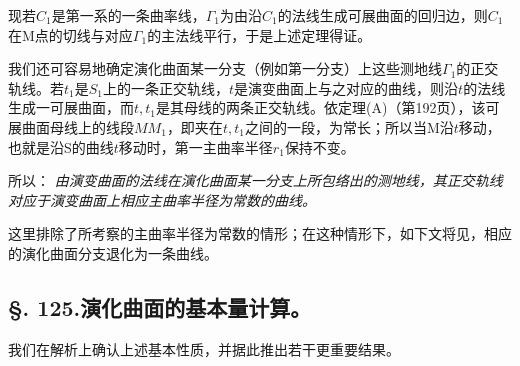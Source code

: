 现若\(C_1\)是第一系的一条曲率线，\(\Gamma_1\)为由沿\(C_1\)的法线生成可展曲面的回归边，则\(C_1\)在M点的切线与对应\(\Gamma_1\)的主法线平行，于是上述定理得证。

我们还可容易地确定演化曲面某一分支（例如第一分支）上这些测地线\(\Gamma_1\)的正交轨线。若\(t_1\)是\(S_1\)上的一条正交轨线，\(t\)是演变曲面上与之对应的曲线，则沿\(t\)的法线生成一可展曲面，而\(t,t_1\)是其母线的两条正交轨线。依定理(A)（第192页），该可展曲面母线上的线段\(MM_1\)，即夹在\(t,t_1\)之间的一段，为常长；所以当M沿\(t\)移动，也就是沿S的曲线\(t\)移动时，第一主曲率半径\(r_1\)保持不变。

所以：
\emph{由演变曲面的法线在演化曲面某一分支上所包络出的测地线，其正交轨线对应于演变曲面上相应主曲率半径为常数的曲线。}

这里排除了所考察的主曲率半径为常数的情形；在这种情形下，如下文将见，相应的演化曲面分支退化为一条曲线。

\subsection*{\S. 125.\quad 演化曲面的基本量计算。}

我们在解析上确认上述基本性质，并据此推出若干更重要结果。


